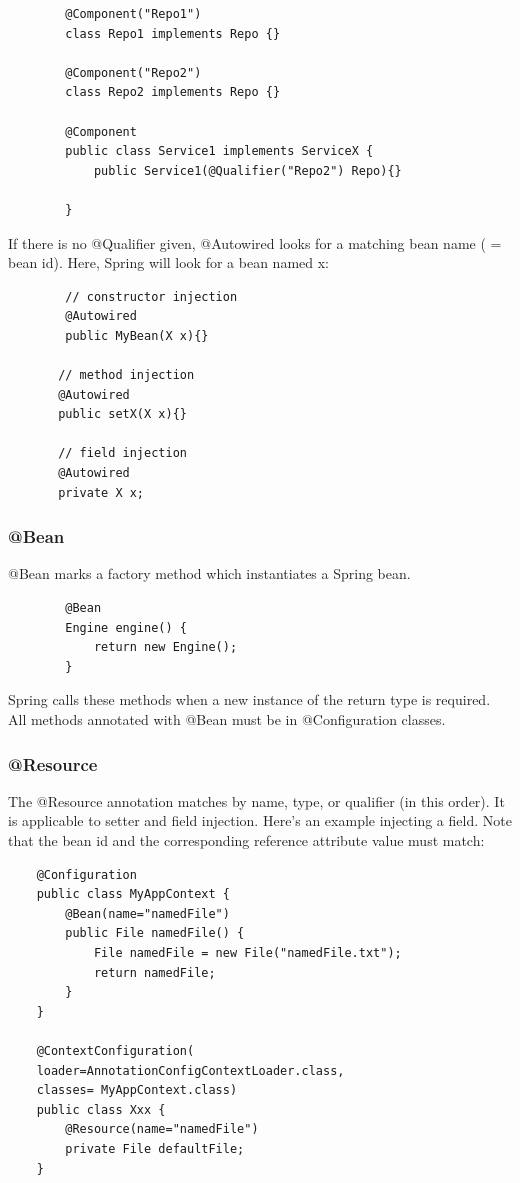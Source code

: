 \documentclass{scrartcl}
\begin{document}
    \begin{lstlisting}
        @Component("Repo1")
        class Repo1 implements Repo {}

        @Component("Repo2")
        class Repo2 implements Repo {}

        @Component
        public class Service1 implements ServiceX {
            public Service1(@Qualifier("Repo2") Repo){}

        }

    \end{lstlisting}

    If there is no @Qualifier given, @Autowired looks for a matching bean name ( = bean id).
    Here, Spring will look for a bean named x:

    \begin{lstlisting}
        // constructor injection
        @Autowired
        public MyBean(X x){}

       // method injection
       @Autowired
       public setX(X x){}

       // field injection
       @Autowired
       private X x;
    \end{lstlisting}

\subsubsection{@Bean}

    @Bean marks a factory method which instantiates a Spring bean.

    \begin{lstlisting}
        @Bean
        Engine engine() {
            return new Engine();
        }
    \end{lstlisting}

    Spring calls these methods when a new instance of the return type is required. All methods annotated with @Bean must be in @Configuration classes.


\subsubsection{@Resource}

The @Resource annotation matches by name, type, or qualifier (in this order). It is applicable to setter and field injection.
Here’s an example injecting a field. Note that the bean id and the corresponding reference attribute value must match:

\begin{lstlisting}
    @Configuration
    public class MyAppContext {
        @Bean(name="namedFile")
        public File namedFile() {
            File namedFile = new File("namedFile.txt");
            return namedFile;
        }
    }

    @ContextConfiguration(
    loader=AnnotationConfigContextLoader.class,
    classes= MyAppContext.class)
    public class Xxx {
        @Resource(name="namedFile")
        private File defaultFile;
    }
\end{lstlisting}
\end{document}
